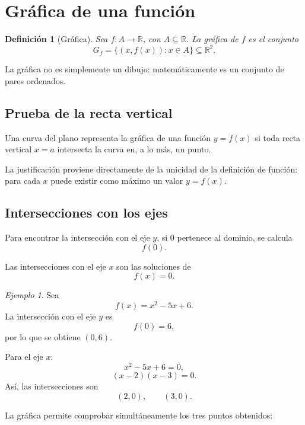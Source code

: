 \documentclass[12pt]{article}
\newtheorem{definicion}{Definición}[section]
\theoremstyle{remark}
\newtheorem{ejemplo}{Ejemplo}[section]
\newcommand{\R}{\mathbb{R}}
\begin{document}
\section{Gráfica de una función}

\begin{definicion}[Gráfica]
Sea $f:A\to\R$, con $A\subseteq\R$. La gráfica de $f$ es el conjunto
\[
G_f=\{(x,f(x)):x\in A\}\subseteq\R^2.
\]
\end{definicion}

La gráfica no es simplemente un dibujo: matemáticamente es un conjunto de
pares ordenados.

\subsection*{Prueba de la recta vertical}

Una curva del plano representa la gráfica de una función $y=f(x)$ si toda
recta vertical $x=a$ intersecta la curva en, a lo más, un punto.

La justificación proviene directamente de la unicidad de la definición de
función: para cada $x$ puede existir como máximo un valor $y=f(x)$.

\subsection*{Intersecciones con los ejes}

Para encontrar la intersección con el eje $y$, si $0$ pertenece al dominio, se
calcula
\[
f(0).
\]

Las intersecciones con el eje $x$ son las soluciones de
\[
f(x)=0.
\]

\begin{ejemplo}
Sea
\[
f(x)=x^2-5x+6.
\]
La intersección con el eje $y$ es
\[
f(0)=6,
\]
por lo que se obtiene $(0,6)$.

Para el eje $x$:
\[
x^2-5x+6=0,
\]
\[
(x-2)(x-3)=0.
\]
Así, las intersecciones son
\[
(2,0),\qquad(3,0).
\]

La gráfica permite comprobar simultáneamente los tres puntos obtenidos:
\begin{center}
\end{center}
\end{ejemplo}
\end{document}
